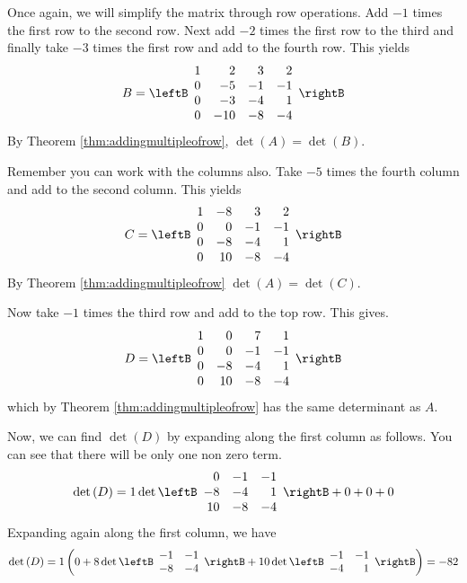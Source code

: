 \begin{solution} 
Once again, we will simplify the matrix through row operations. 
Add $-1$ times the first row to
the second row. Next add $-2$ times the first row to the third and finally take
$-3$ times the first row and add to the fourth row. This yields
\begin{equation*}
B = \leftB 
\begin{array}{rrrr}
1 & 2 & 3 & 2 \\
0 & -5 & -1 & -1 \\
0 & -3 & -4 & 1 \\
0 & -10 & -8 & -4
\end{array}
\rightB 
\end{equation*}
By Theorem \ref{thm:addingmultipleofrow}, $\det \left(A\right) = \det \left(B\right)$. 

Remember you can work with the columns also. Take $-5$
times the fourth column and add to the second column. This yields
\begin{equation*}
C = \leftB 
\begin{array}{rrrr}
1 & -8 & 3 & 2 \\
0 & 0 & -1 & -1 \\
0 & -8 & -4 & 1 \\
0 & 10 & -8 & -4
\end{array}
\rightB
\end{equation*}
By Theorem \ref{thm:addingmultipleofrow} $\det \left(A\right) = \det \left(C\right)$. 

Now take $-1$ times the third row and add to
the top row. This gives.
\begin{equation*}
D = \leftB
\begin{array}{rrrr}
1 & 0 & 7 & 1 \\
0 & 0 & -1 & -1 \\
0 & -8 & -4 & 1 \\
0 & 10 & -8 & -4
\end{array}
\rightB
\end{equation*}
which by Theorem \ref{thm:addingmultipleofrow} has the same determinant as $A$.

Now, we can find $\det \left(D\right)$ by expanding along the first column as follows. You can see that there will be only one non zero term.
\begin{equation*}
\det \left(D\right) = 1 \det \leftB
\begin{array}{rrr}
0 & -1 & -1 \\
-8 & -4 & 1 \\
10 & -8 & -4
\end{array}
\rightB
+ 0 + 0 + 0 
\end{equation*}
Expanding again along the first column, we have
\begin{equation*}
\det \left(D\right) 
=
1 \left ( 0 +  8\det \leftB
\begin{array}{rr}
-1 & -1 \\
-8 & -4
\end{array}
\rightB +10\det \leftB
\begin{array}{rr}
-1 & -1 \\
-4 & 1
\end{array}
\rightB \right) = -82
\end{equation*}


\end{solution}
